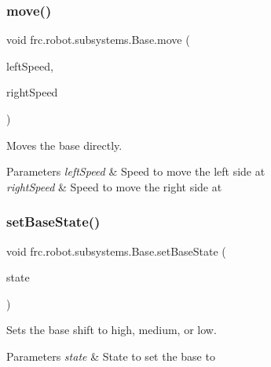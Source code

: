 \subsubsection{\texorpdfstring{move()}{move()}}
{\footnotesize\ttfamily void frc.\+robot.\+subsystems.\+Base.\+move (\begin{DoxyParamCaption}\item[{double}]{left\+Speed,  }\item[{double}]{right\+Speed }\end{DoxyParamCaption})\hspace{0.3cm}{\ttfamily [inline]}}



Moves the base directly. 


\begin{DoxyParams}{Parameters}
{\em left\+Speed} & Speed to move the left side at \\
\hline
{\em right\+Speed} & Speed to move the right side at \\
\hline
\end{DoxyParams}
\mbox{\label{classfrc_1_1robot_1_1subsystems_1_1_base_a4ec90478ab5deafb1910a2715e7a8860}} 
\subsubsection{\texorpdfstring{setBaseState()}{setBaseState()}}
{\footnotesize\ttfamily void frc.\+robot.\+subsystems.\+Base.\+set\+Base\+State (\begin{DoxyParamCaption}\item[{\mbox{\hyperlink{enumfrc_1_1robot_1_1enums_1_1_base_state}{Base\+State}}}]{state }\end{DoxyParamCaption})\hspace{0.3cm}{\ttfamily [inline]}}



Sets the base shift to high, medium, or low. 


\begin{DoxyParams}{Parameters}
{\em state} & State to set the base to \\
\hline
\end{DoxyParams}
\mbox{\label{classfrc_1_1robot_1_1subsystems_1_1_base_a66397121d0fe18c2132a48163d35af63}} 

